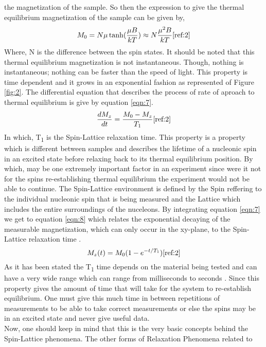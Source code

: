 \documentclass{article}
\begin{document}
{\begin{multicols}{2}
the magnetization of the sample. So then the expression to give the thermal 
equilibrium magnetization of the sample can be given by,
\begin{equation}
M_0 = N\mu \tanh(\frac{\mu B}{kT})\approx N \frac{\mu^2 B}{kT}
\label{eqn:6}
\cite{ref:2}
\end{equation}
Where, N is the difference between the spin states. It should be noted that 
this thermal equilibrium magnetization is not instantaneous. Though, nothing is 
instantaneous; nothing can be faster than the speed of light. This property is 
time dependent and it grows in an exponential fashion as represented of Figure 
\ref{fig:2}. The differential equation that describes the process of rate of 
aproach to thermal equilibrium is give by equation \ref{eqn:7}.
\begin{equation}
\frac{dM_z}{dt} = \frac{M_0 - M_z}{T_1}
\label{eqn:7}
\cite{ref:2}
\end{equation}
In which, T\textsubscript{1} is the Spin-Lattice relaxation time. This property 
is a property which is different between samples and describes the lifetime of 
a nucleonic spin in an excited state before relaxing back to its thermal 
equilibrium position. By which, may be 
one extremely important factor in an experiment since were it not for the spins 
re-establishing thermal equilibrium the experiment would not be able to 
continue. The Spin-Lattice environment is defined by the Spin reffering to the 
individual nucleonic spin that is being measured and the Lattice which includes 
the entire surroundings of the nuceleons. By integrating equation \ref{eqn:7} 
we get to equation \ref{eqn:8} which relates the exponential decaying of the 
measurable magnetization, which can only occur in the xy-plane, to the 
Spin-Lattice relaxation time \cite{ref:1}.
\begin{equation}
M_z (t) = M_0 (1-e^{-t/T_1})
\label{eqn:8}
\cite{ref:2}
\end{equation}
As it has been stated the T\textsubscript{1} time depends on the material being 
tested and can have a very wide range which can range from milliseconds to 
seconds \cite{ref:2}. Since this property gives the amount of time that will 
take for the 
system to re-establish equilibrium. One must give this much time in between 
repetitions of measurements to be able to take correct measurements or else the 
spins may be in an excited state and never give useful data.
\\
Now, one should keep in mind that this is the very basic concepts behind the 
Spin-Lattice phenomena. The other forms of Relaxation Phenomena related to 

\end{multicols}}
\end{document}
